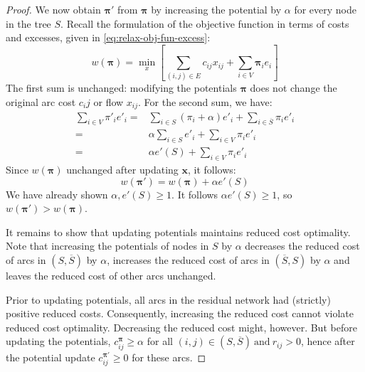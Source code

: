 \begin{proof}
We now obtain $\boldsymbol{\pi}'$ from $\boldsymbol{\pi}$ by increasing the potential by $\alpha$ for every node in the tree $S$. Recall the formulation of the objective function in terms of costs and excesses, given in \cref{eq:relax-obj-fun-excess}:
\[w\left(\boldsymbol{\pi}\right)=\min_{x}\left[\sum_{\left(i,j\right)\in E}c_{ij}x_{ij}+\sum_{i\in V}\boldsymbol{\pi}_{i}e_{i}\right]\]
The first sum is unchanged: modifying the potentials $\boldsymbol{\pi}$ does not change the original arc cost $c_ij$ or flow $x_{ij}$. For the second sum, we have:
\begin{align*}
\sum_{i\in V}\pi'_{i}e'_{i}= & \sum_{i\in S}\left(\pi_{i}+\alpha\right)e'_{i}+\sum_{i\in\overline{S}}\pi_{i}e'_{i}\\
= & \alpha\sum_{i\in S}e'_{i}+\sum_{i\in V}\pi_{i}e'_{i}\\
= & \alpha e'(S)+\sum_{i\in V}\pi_{i}e'_{i}
\end{align*}
Since $w\left(\boldsymbol{\pi}\right)$ unchanged after updating $\mathbf{x}$, it follows:
\[w\left(\boldsymbol{\pi}'\right)=w(\boldsymbol{\pi})+\alpha e'(S)\]
We have already shown $\alpha, e'(S) \geq 1$. It follows $\alpha e'(S) \geq 1$, so $w\left(\boldsymbol{\pi}'\right) > w\left(\boldsymbol{\pi}\right)$.

It remains to show that updating potentials maintains reduced cost optimality. Note that increasing the potentials of nodes in $S$ by $\alpha$ decreases the reduced cost of arcs in $\left(S,\overline{S}\right)$ by $\alpha$, increases the reduced cost of arcs in $\left(\overline{S},S\right)$ by $\alpha$ and leaves the reduced cost of other arcs unchanged.

Prior to updating potentials, all arcs in the residual network had (strictly) positive reduced costs. Consequently, increasing the reduced cost cannot violate reduced cost optimality\footnotemark.
 Decreasing the reduced cost might, however. But before updating the potentials, $c_{ij}^{\boldsymbol{\pi}} \geq \alpha$ for all $(i,j)\in\left(S,\overline{S}\right)\:\mbox{and}\:r_{ij}>0$, hence after the potential update $c_{ij}^{\boldsymbol{\pi}'}\geq 0$ for these arcs.
\end{proof}

